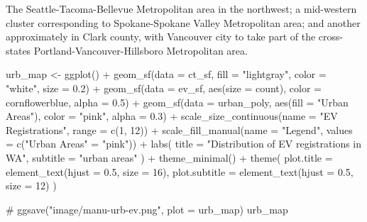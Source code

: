 \documentclass[
  letterpaper,
  DIV=11,
  numbers=noendperiod]{scrartcl}
\newenvironment{Shaded}{\begin{snugshade}}{\end{snugshade}}
\newcommand{\AttributeTok}[1]{\textcolor[rgb]{0.40,0.45,0.13}{#1}}
\newcommand{\CommentTok}[1]{\textcolor[rgb]{0.37,0.37,0.37}{#1}}
\newcommand{\DecValTok}[1]{\textcolor[rgb]{0.68,0.00,0.00}{#1}}
\newcommand{\FloatTok}[1]{\textcolor[rgb]{0.68,0.00,0.00}{#1}}
\newcommand{\FunctionTok}[1]{\textcolor[rgb]{0.28,0.35,0.67}{#1}}
\newcommand{\NormalTok}[1]{\textcolor[rgb]{0.00,0.23,0.31}{#1}}
\newcommand{\OtherTok}[1]{\textcolor[rgb]{0.00,0.23,0.31}{#1}}
\newcommand{\SpecialCharTok}[1]{\textcolor[rgb]{0.37,0.37,0.37}{#1}}
\newcommand{\StringTok}[1]{\textcolor[rgb]{0.13,0.47,0.30}{#1}}
\begin{document}
The Seattle-Tacoma-Bellevue Metropolitan area in the northwest; a
mid-western cluster corresponding to Spokane-Spokane Valley Metropolitan
area; and another approximately in Clark county, with Vancouver city to
take part of the cross-states Portland-Vancouver-Hillsboro Metropolitan
area.

\begin{Shaded}
\begin{Highlighting}[]
\NormalTok{urb\_map }\OtherTok{\textless{}{-}} \FunctionTok{ggplot}\NormalTok{() }\SpecialCharTok{+}
  \FunctionTok{geom\_sf}\NormalTok{(}\AttributeTok{data =}\NormalTok{ ct\_sf, }\AttributeTok{fill =} \StringTok{"lightgray"}\NormalTok{, }\AttributeTok{color =} \StringTok{"white"}\NormalTok{, }\AttributeTok{size =} \FloatTok{0.2}\NormalTok{) }\SpecialCharTok{+} 
  \FunctionTok{geom\_sf}\NormalTok{(}\AttributeTok{data =}\NormalTok{ ev\_sf, }\FunctionTok{aes}\NormalTok{(}\AttributeTok{size =}\NormalTok{ count), }\AttributeTok{color =} \StringTok{\textquotesingle{}cornflowerblue\textquotesingle{}}\NormalTok{, }\AttributeTok{alpha =} \FloatTok{0.5}\NormalTok{) }\SpecialCharTok{+}
  \FunctionTok{geom\_sf}\NormalTok{(}\AttributeTok{data =}\NormalTok{ urban\_poly, }\FunctionTok{aes}\NormalTok{(}\AttributeTok{fill =} \StringTok{"Urban Areas"}\NormalTok{), }\AttributeTok{color =} \StringTok{"pink"}\NormalTok{, }\AttributeTok{alpha =} \FloatTok{0.3}\NormalTok{) }\SpecialCharTok{+}
  \FunctionTok{scale\_size\_continuous}\NormalTok{(}\AttributeTok{name =} \StringTok{"EV Registrations"}\NormalTok{, }\AttributeTok{range =} \FunctionTok{c}\NormalTok{(}\DecValTok{1}\NormalTok{, }\DecValTok{12}\NormalTok{)) }\SpecialCharTok{+}
  \FunctionTok{scale\_fill\_manual}\NormalTok{(}\AttributeTok{name =} \StringTok{"Legend"}\NormalTok{, }\AttributeTok{values =} \FunctionTok{c}\NormalTok{(}\StringTok{"Urban Areas"} \OtherTok{=} \StringTok{"pink"}\NormalTok{)) }\SpecialCharTok{+}
  \FunctionTok{labs}\NormalTok{(}
    \AttributeTok{title =} \StringTok{"Distribution of EV registrations in WA"}\NormalTok{,}
    \AttributeTok{subtitle =} \StringTok{"urban areas"}
\NormalTok{  ) }\SpecialCharTok{+}
  \FunctionTok{theme\_minimal}\NormalTok{() }\SpecialCharTok{+}
  \FunctionTok{theme}\NormalTok{(}
    \AttributeTok{plot.title =} \FunctionTok{element\_text}\NormalTok{(}\AttributeTok{hjust =} \FloatTok{0.5}\NormalTok{, }\AttributeTok{size =} \DecValTok{16}\NormalTok{),}
    \AttributeTok{plot.subtitle =} \FunctionTok{element\_text}\NormalTok{(}\AttributeTok{hjust =} \FloatTok{0.5}\NormalTok{, }\AttributeTok{size =} \DecValTok{12}\NormalTok{)}
\NormalTok{  )}

\CommentTok{\# ggsave("image/manu{-}urb{-}ev.png", plot = urb\_map)}
\NormalTok{urb\_map}
\end{Highlighting}
\end{Shaded}
\end{document}
